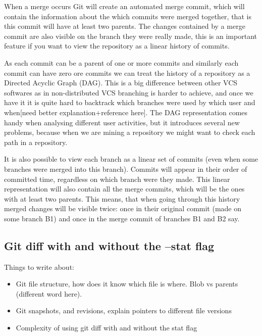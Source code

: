 \documentclass[12pt,twoside,notitlepage]{report}
\begin{document}
When a merge occurs Git will create an automated merge commit, which will contain the information about the which commits were merged together, that is this commit will have at least two parents. The changes contained by a merge commit are also visible on the branch they were really made, this is an important feature if you want to view the repository as a linear history of commits. 

As each commit can be a parent of one or more commits and similarly each commit can have zero ore commits we can treat the history of a repository as a Directed Acyclic Graph (DAG). This is a big difference between other VCS softwares as in non-distributed VCS branching is harder to achieve, and once we have it it is quite hard to backtrack which branches were used by which user and when[need better explanation+reference here]. The DAG representation comes handy when analysing different user activities, but it introduces several new problems, because when we are mining a repository we might want to check each path in a repository. 

It is also possible to view each branch as a linear set of commits (even when some branches were merged into this branch). Commits will appear in their order of committed time, regardless on which branch were they made. This linear representation will also contain all the merge commits, which will be the ones with at least two parents. This means, that when going through this history merged changes will be visible twice: once in their original commit (made on some branch B1) and once in the merge commit of branches B1 and B2 say.
\subsection*{Git diff with and without the --stat flag}
Things to write about:
\begin{itemize}
\item Git file structure, how does it know which file is where. Blob vs parents (different word here). 
\item Git snapshots, and revisions, explain pointers to different file versions
\item Complexity of using git diff with and without the stat flag
\end{itemize}
\end{document}
